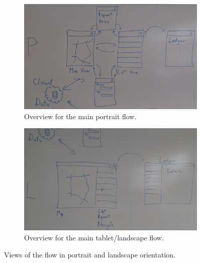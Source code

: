 \begin{figure}[h]
	\centering
	\begin{subfigure}[b]{0.45\textwidth}
		\centering
		\includegraphics[width=\textwidth]{P.jpg}
		\caption{Overview for the main portrait flow.}
		\label{fig:p}
	\end{subfigure}
	\quad
	\begin{subfigure}[b]{0.45\textwidth}
		\centering
		\includegraphics[width=\textwidth]{L.jpg}
		\caption{Overview for the main tablet/landscape flow.}
		\label{fig:l}
	\end{subfigure}
	\caption{Views of the flow in portrait and landscape orientation.}
\end{figure}

